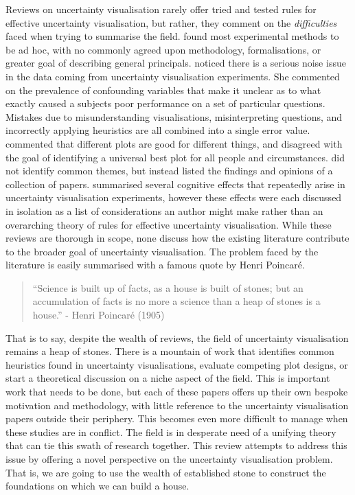 \documentclass[
  12pt]{article}
\begin{document}
Reviews on uncertainty visualisation rarely offer tried and tested rules
for effective uncertainty visualisation, but rather, they comment on the
\emph{difficulties} faced when trying to summarise the field.
\citet{Kinkeldey2014} found most experimental methods to be ad hoc, with
no commonly agreed upon methodology, formalisations, or greater goal of
describing general principals. \citet{Hullman2016} noticed there is a
serious noise issue in the data coming from uncertainty visualisation
experiments. She commented on the prevalence of confounding variables
that make it unclear as to what exactly caused a subjects poor
performance on a set of particular questions. Mistakes due to
misunderstanding visualisations, misinterpreting questions, and
incorrectly applying heuristics are all combined into a single error
value. \citet{Spiegelhalter2017} commented that different plots are good
for different things, and disagreed with the goal of identifying a
universal best plot for all people and circumstances.
\citet{Griethe2006} did not identify common themes, but instead listed
the findings and opinions of a collection of papers.
\citet{uncertchap2022} summarised several cognitive effects that
repeatedly arise in uncertainty visualisation experiments, however these
effects were each discussed in isolation as a list of considerations an
author might make rather than an overarching theory of rules for
effective uncertainty visualisation. While these reviews are thorough in
scope, none discuss how the existing literature contribute to the
broader goal of uncertainty visualisation. The problem faced by the
literature is easily summarised with a famous quote by Henri Poincaré.

\begin{quote}
``Science is built up of facts, as a house is built of stones; but an
accumulation of facts is no more a science than a heap of stones is a
house.'' - Henri Poincaré (1905)
\end{quote}

That is to say, despite the wealth of reviews, the field of uncertainty
visualisation remains a heap of stones. There is a mountain of work that
identifies common heuristics found in uncertainty visualisations,
evaluate competing plot designs, or start a theoretical discussion on a
niche aspect of the field. This is important work that needs to be done,
but each of these papers offers up their own bespoke motivation and
methodology, with little reference to the uncertainty visualisation
papers outside their periphery. This becomes even more difficult to
manage when these studies are in conflict. The field is in desperate
need of a unifying theory that can tie this swath of research together.
This review attempts to address this issue by offering a novel
perspective on the uncertainty visualisation problem. That is, we are
going to use the wealth of established stone to construct the
foundations on which we can build a house.
\end{document}
